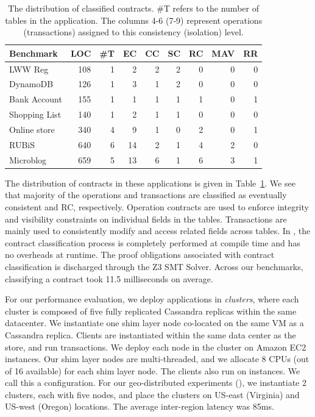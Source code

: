 \begin{table}
\setlength{\tabcolsep}{4pt}
{\sffamily \small
\begin{center}
\begin{tabular} {|l|r|r|r|r|r|r|r|r|}
\hline
{\bf Benchmark} & {\bf LOC} & {\bf \#T} & {\bf EC} & {\bf CC} & {\bf SC} & {\bf RC} & {\bf MAV} & {\bf RR} \\
\hline
{LWW Reg} & 108 & 1 & 2 & 2 & 2 & 0 & 0 & 0 \\
{DynamoDB} & 126 & 1 & 3 & 1 & 2 & 0 & 0 & 0 \\
{Bank Account} & 155 & 1 & 1 & 1 & 1 & 1 & 0 & 1 \\
{Shopping List} & 140 & 1 & 2 & 1 & 1 & 0 & 0 & 0 \\
{Online store} & 340 & 4 & 9 & 1 & 0 & 2 & 0 & 1 \\
{RUBiS} & 640 & 6 & 14 & 2 & 1 & 4 & 2 & 0 \\
{Microblog} & 659 & 5 & 13 & 6 & 1 & 6 & 3 & 1 \\
\hline
\end{tabular}
\end{center} }
\caption{The distribution of classified contracts. \#T refers to the number of
tables in the application. The columns 4-6 (7-9) represent operations
(transactions) assigned to this consistency (isolation) level.}
\label{tab:ctrts}
\end{table}

The distribution of contracts in these applications is given in
Table~\ref{tab:ctrts}. We see that majority of the operations and
transactions are classified as eventually consistent and RC,
respectively. Operation contracts are used to enforce integrity and
visibility constraints on individual fields in the tables. Transactions are
mainly used to consistently modify and access related fields across
tables. In \name, the contract classification process is completely
performed at compile time and has no overheads at runtime. The proof
obligations associated with contract classification is discharged through
the Z3 SMT Solver. Across our benchmarks, classifying a contract took 11.5
milliseconds on average.

For our performance evaluation, we deploy \name applications in
\emph{clusters}, where each cluster is composed of five fully replicated
Cassandra replicas within the same datacenter. We instantiate one shim layer
node co-located on the same VM as a Cassandra replica. Clients are
instantiated within the same data center as the store, and run
transactions. We deploy each node in the cluster on  Amazon
EC2 instances.  Our shim layer nodes are multi-threaded, and we allocate 8
CPUs (out of 16 available) for each shim layer node. The clients also run on
 instances. We call this a  configuration. For our
geo-distributed experiments (), we instantiate 2 clusters, each with
five nodes, and place the clusters on US-east (Virginia) and US-west
(Oregon) locations. The average inter-region latency was 85ms.

